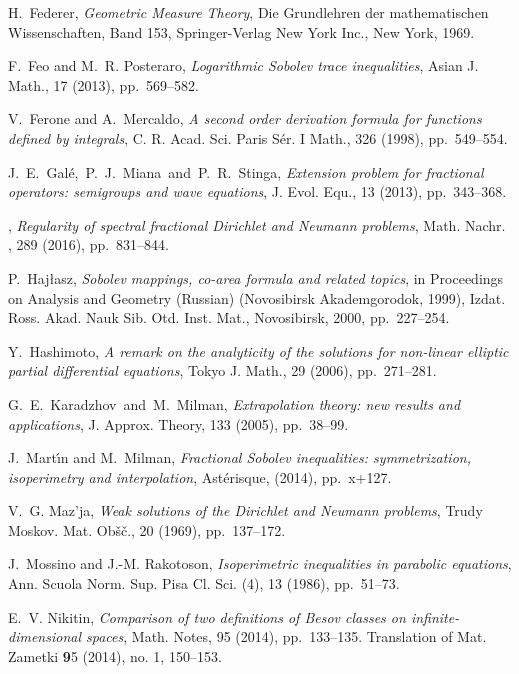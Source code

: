 \documentclass[a4paper,10pt,reqno]{amsart}
\numberwithin{equation}{section}
\begin{document}
\begin{thebibliography}{10}
{\sc H.~Federer}, {\em Geometric Measure Theory}, Die Grundlehren der
  mathematischen Wissenschaften, Band 153, Springer-Verlag New York Inc., New
  York, 1969.

{\sc F.~Feo and M.~R. Posteraro}, {\em Logarithmic {S}obolev trace
  inequalities}, Asian J. Math., 17 (2013), pp.~569--582.

{\sc V.~Ferone and A.~Mercaldo}, {\em A second order derivation formula for
  functions defined by integrals}, C. R. Acad. Sci. Paris S\'er. I Math., 326
  (1998), pp.~549--554.

{\sc J.~E.~Gal\'e,~P.~J.~Miana~and~P.~R.~Stinga},
{\em Extension problem for fractional operators: semigroups and wave equations},
J. Evol. Equ., 13 (2013), pp.~343--368.


, {\em
     Regularity of spectral fractional {D}irichlet and {N}eumann
              problems}, Math. Nachr. , 289 (2016), pp.~831--844.

{\sc P.~Haj{\l}asz}, {\em Sobolev mappings, co-area formula and related
  topics}, in Proceedings on {A}nalysis and {G}eometry ({R}ussian)
  ({N}ovosibirsk {A}kademgorodok, 1999), Izdat. Ross. Akad. Nauk Sib. Otd.
  Inst. Mat., Novosibirsk, 2000, pp.~227--254.

{\sc Y.~Hashimoto}, {\em A remark on the analyticity of the solutions for
  non-linear elliptic partial differential equations}, Tokyo J. Math., 29
  (2006), pp.~271--281.

{\sc G.~E.~Karadzhov~and~M.~Milman}, {\em Extrapolation theory: new results and applications},
J. Approx. Theory, 133 (2005), pp.~38--99.

{\sc J.~Mart{\'{\i}}n and M.~Milman}, {\em Fractional {S}obolev inequalities:
  symmetrization, isoperimetry and interpolation}, Ast\'erisque,  (2014),
  pp.~x+127.

{\sc V.~G. Maz'ja}, {\em Weak solutions of the {D}irichlet and {N}eumann
  problems}, Trudy Moskov. Mat. Ob\v s\v c., 20 (1969), pp.~137--172.

{\sc J.~Mossino and J.-M. Rakotoson}, {\em Isoperimetric inequalities in
  parabolic equations}, Ann. Scuola Norm. Sup. Pisa Cl. Sci. (4), 13 (1986),
  pp.~51--73.

{\sc E.~V. Nikitin}, {\em Comparison of two definitions of {B}esov classes on
  infinite-dimensional spaces}, Math. Notes, 95 (2014), pp.~133--135.
\newblock Translation of Mat. Zametki {{\bf{9}}5} (2014), no. 1, 150--153.


\end{thebibliography}
\end{document}
